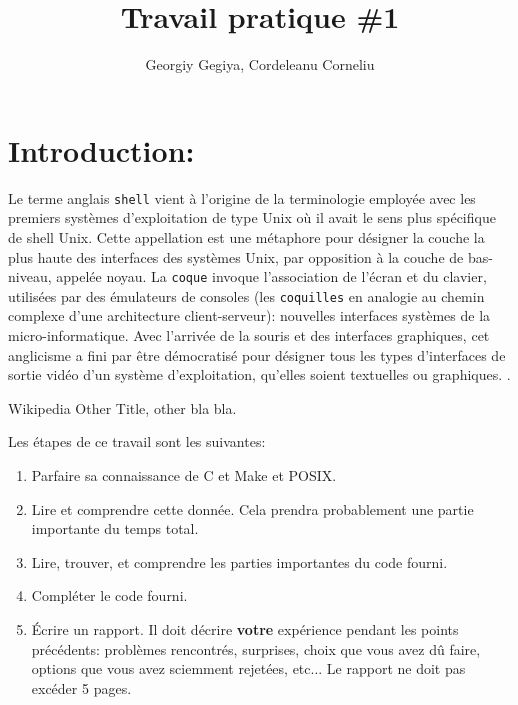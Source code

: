 \documentclass{article}
\title{Travail pratique \#1}
\author{Georgiy Gegiya, Cordeleanu Corneliu}
\begin{document}
\maketitle

\newcommand \mML {\ensuremath\mu\textsl{ML}}
\newcommand \kw [1] {\textsf{#1}}
\newcommand \id [1] {\textsl{#1}}
\newcommand \punc [1] {\kw{`#1'}}
\newcommand \str [1] {\texttt{"#1"}}
\newenvironment{outitemize}{
  \begin{itemize}
  \let \origitem \item \def \item {\origitem[]\hspace{-18pt}}
}{
  \end{itemize}
}
\newcommand \Align [2][t] {
  \begin{array}[#1]{@{}l}
    #2
  \end{array}}

\section{Introduction:}

Le terme anglais \texttt{shell} vient à l'origine de la terminologie employée 
avec les premiers systèmes d'exploitation de type Unix où il avait le sens plus 
spécifique de shell Unix. Cette appellation est une métaphore pour désigner la couche
la plus haute des interfaces des systèmes Unix, par opposition à la couche de bas-niveau,
appelée noyau. La \texttt{coque} invoque l'association de l'écran et du clavier,
utilisées par des émulateurs de consoles (les \texttt{coquilles} en analogie 
au chemin complexe d'une architecture client-serveur): nouvelles interfaces systèmes
de la micro-informatique. Avec l'arrivée de la souris et des interfaces graphiques, 
cet anglicisme a fini par être démocratisé pour désigner tous les types d'interfaces
de sortie vidéo d'un système d'exploitation, qu'elles soient textuelles ou graphiques. 
\cite{Widipedia}.

\begin{thebibliography}{2}

  Wikipedia
  Other Title,
  other bla bla.

\end{thebibliography}

Les étapes de ce travail sont les suivantes:
\begin{enumerate}
\item Parfaire sa connaissance de C et Make et POSIX.
\item Lire et comprendre cette donnée.  Cela prendra probablement une partie
  importante du temps total.
\item Lire, trouver, et comprendre les parties importantes du code fourni.
\item Compléter le code fourni.
\item Écrire un rapport.  Il doit décrire \textbf{votre} expérience pendant
  les points précédents: problèmes rencontrés, surprises, choix que vous
  avez dû faire, options que vous avez sciemment rejetées, etc...  Le
  rapport ne doit pas excéder 5 pages.
\end{enumerate}
\end{document}
